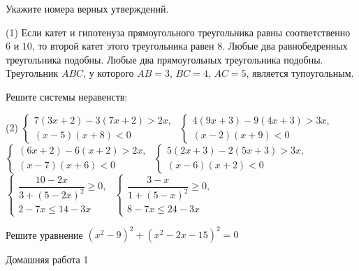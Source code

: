\begin{class}[number=2]
\begin{listofex}
\begin{tasks}
		\end{tasks}
		\item Укажите номера верных утверждений.
		\begin{tasks}(1)
			\task Если катет и гипотенуза прямоугольного треугольника равны соответственно \( 6 \) и \( 10 \), то второй катет этого треугольника равен \( 8 \).
			\task Любые два равнобедренных треугольника подобны.
			\task Любые два прямоугольных треугольника подобны.
			\task Треугольник \( ABC \), у которого \( AB=3 \), \( BC=4 \), \( AC=5 \), является тупоугольным.
		\end{tasks}
		\item Решите системы неравенств:
		\begin{tasks}(2)
			\task \( \begin{cases}
				 7(3x+2)-3(7x+2)>2x ,\\
				(x-5)(x+8)<0
			\end{cases} \)
			\task \( \begin{cases}
				4(9x+3)-9(4x+3)>3x,\\
				(x-2)(x+9)<0
			\end{cases} \)
			\task \( \begin{cases}
			(6x+2)-6(x+2)>2x,\\
			(x-7)(x+6)<0
			\end{cases} \)
			\task \( \begin{cases}
			5(2x+3)-2(5x+3)>3x,\\
			(x-6)(x+2)<0
			\end{cases} \)
			\task \( \begin{cases}
			\dfrac{10-2x}{3+(5-2x)^2}\ge0,\\
			2-7x\le14-3x
			\end{cases} \)
			\task \( \begin{cases}
			\dfrac{3-x}{1+(5-x)^2}\ge0,\\
			8-7x\le24-3x
			\end{cases} \)
		\end{tasks}
		\item Решите уравнение \( (x^2-9)^2+(x^2-2x-15)^2=0 \)
	\end{listofex}
\end{class}

\begin{homework}[number=1]
	\begin{listofex}
		\item Домашняя работа 1
	\end{listofex}
\end{homework}

